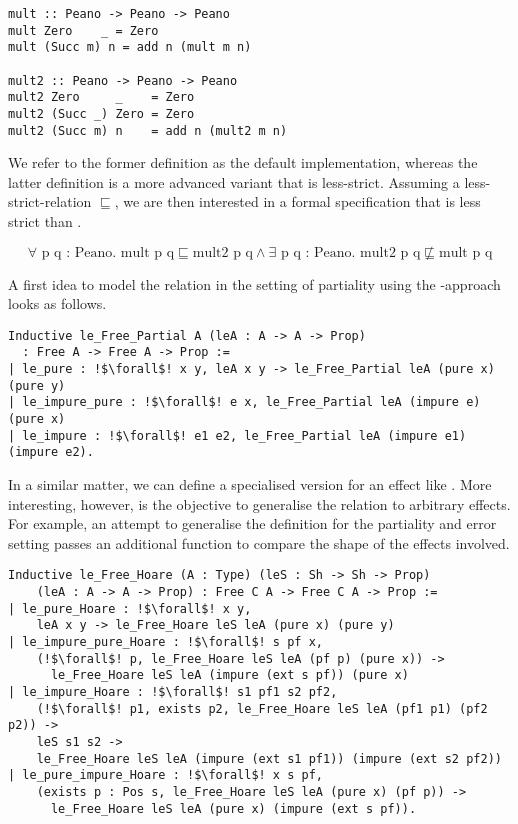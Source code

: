 \begin{verbatim}
mult :: Peano -> Peano -> Peano
mult Zero    _ = Zero
mult (Succ m) n = add n (mult m n)

mult2 :: Peano -> Peano -> Peano
mult2 Zero     _    = Zero
mult2 (Succ _) Zero = Zero
mult2 (Succ m) n    = add n (mult2 m n)
\end{verbatim}

We refer to the former definition as the default implementation, whereas the latter definition is a more advanced variant that is less\--strict.
Assuming a less\--strict\--relation $\sqsubseteq$, we are then interested in a formal specification that  is less strict than .

\[
\forall \text{ p q : Peano}. \text{ mult p q} \sqsubseteq \text{mult2
  p q} \wedge \exists \text{ p q : Peano}. \text{ mult2 p q} \not \sqsubseteq \text{mult p q}
\]

A first idea to model the relation in the setting of partiality using the \--approach looks as follows.

\begin{verbatim}
Inductive le_Free_Partial A (leA : A -> A -> Prop)
  : Free A -> Free A -> Prop :=
| le_pure : !$\forall$! x y, leA x y -> le_Free_Partial leA (pure x) (pure y)
| le_impure_pure : !$\forall$! e x, le_Free_Partial leA (impure e) (pure x)
| le_impure : !$\forall$! e1 e2, le_Free_Partial leA (impure e1) (impure e2).
\end{verbatim}

In a similar matter, we can define a specialised version for an effect like .
More interesting, however, is the objective to generalise the relation to arbitrary effects.
For example, an attempt to generalise the definition for the partiality and error setting passes an additional function to compare the shape of the effects involved.

\begin{verbatim}
Inductive le_Free_Hoare (A : Type) (leS : Sh -> Sh -> Prop)
    (leA : A -> A -> Prop) : Free C A -> Free C A -> Prop :=
| le_pure_Hoare : !$\forall$! x y,
    leA x y -> le_Free_Hoare leS leA (pure x) (pure y)
| le_impure_pure_Hoare : !$\forall$! s pf x,
    (!$\forall$! p, le_Free_Hoare leS leA (pf p) (pure x)) ->
      le_Free_Hoare leS leA (impure (ext s pf)) (pure x)
| le_impure_Hoare : !$\forall$! s1 pf1 s2 pf2,
    (!$\forall$! p1, exists p2, le_Free_Hoare leS leA (pf1 p1) (pf2 p2)) ->
    leS s1 s2 ->
    le_Free_Hoare leS leA (impure (ext s1 pf1)) (impure (ext s2 pf2))
| le_pure_impure_Hoare : !$\forall$! x s pf,
    (exists p : Pos s, le_Free_Hoare leS leA (pure x) (pf p)) ->
      le_Free_Hoare leS leA (pure x) (impure (ext s pf)).
\end{verbatim}

